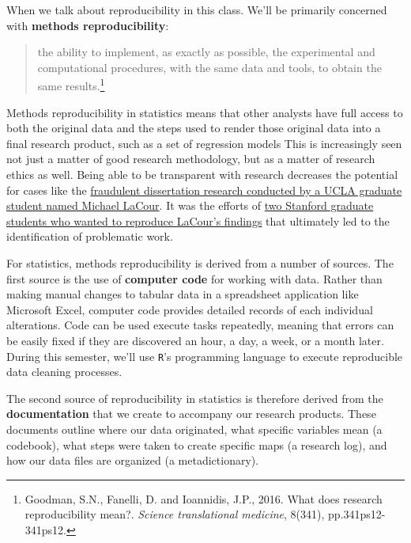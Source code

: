 \documentclass[]{book}
\let\rmarkdownfootnote\footnote%
\def\footnote{\protect\rmarkdownfootnote}
\theoremstyle{definition}
\theoremstyle{definition}
\theoremstyle{definition}
\theoremstyle{remark}
\begin{document}
When we talk about reproducibility in this class. We'll be primarily
concerned with \textbf{methods reproducibility}:

\begin{quote}
the ability to implement, as exactly as possible, the experimental and
computational procedures, with the same data and tools, to obtain the
same results.\footnote{Goodman, S.N., Fanelli, D. and Ioannidis, J.P.,
  2016. What does research reproducibility mean?. \emph{Science
  translational medicine}, 8(341), pp.341ps12-341ps12.}
\end{quote}

Methods reproducibility in statistics means that other analysts have
full access to both the original data and the steps used to render those
original data into a final research product, such as a set of regression
models This is increasingly seen not just a matter of good research
methodology, but as a matter of research ethics as well. Being able to
be transparent with research decreases the potential for cases like the
\href{http://nymag.com/scienceofus/2015/05/how-a-grad-student-uncovered-a-huge-fraud.html}{fraudulent
dissertation research conducted by a UCLA graduate student named Michael
LaCour}. It was the efforts of
\href{https://fivethirtyeight.com/features/how-two-grad-students-uncovered-michael-lacour-fraud-and-a-way-to-change-opinions-on-transgender-rights/}{two
Stanford graduate students who wanted to reproduce LaCour's findings}
that ultimately led to the identification of problematic work.

For statistics, methods reproducibility is derived from a number of
sources. The first source is the use of \textbf{computer code} for
working with data. Rather than making manual changes to tabular data in
a spreadsheet application like Microsoft Excel, computer code provides
detailed records of each individual alterations. Code can be used
execute tasks repeatedly, meaning that errors can be easily fixed if
they are discovered an hour, a day, a week, or a month later. During
this semester, we'll use \texttt{R}'s programming language to execute
reproducible data cleaning processes.

The second source of reproducibility in statistics is therefore derived
from the \textbf{documentation} that we create to accompany our research
products. These documents outline where our data originated, what
specific variables mean (a codebook), what steps were taken to create
specific maps (a research log), and how our data files are organized (a
metadictionary).
\end{document}
